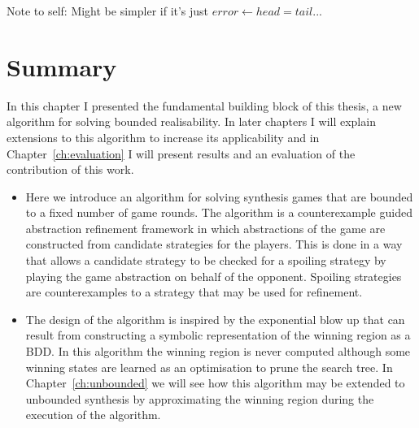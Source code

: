 Note to self: Might be simpler if it's just $error \gets head = tail$...

\section{Summary}

In this chapter I presented the fundamental building block of this thesis, a new algorithm for solving bounded realisability. In later chapters I will explain extensions to this algorithm to increase its applicability and in Chapter~\ref{ch:evaluation} I will present results and an evaluation of the contribution of this work.

\begin{itemize}
    \item Here we introduce an algorithm for solving synthesis games that are bounded to a fixed number of game rounds. The algorithm is a counterexample guided abstraction refinement framework in which abstractions of the game are constructed from candidate strategies for the players. This is done in a way that allows a candidate strategy to be checked for a spoiling strategy by playing the game abstraction on behalf of the opponent. Spoiling strategies are counterexamples to a strategy that may be used for refinement.

    \item The design of the algorithm is inspired by the exponential blow up that can result from constructing a symbolic representation of the winning region as a BDD. In this algorithm the winning region is never computed although some winning states are learned as an optimisation to prune the search tree. In Chapter~\ref{ch:unbounded} we will see how this algorithm may be extended to unbounded synthesis by approximating the winning region during the execution of the algorithm.

\end{itemize}



